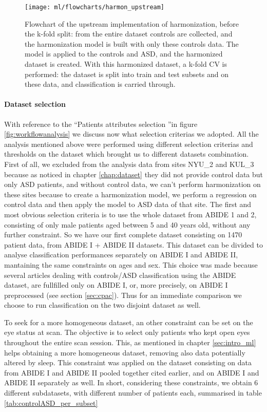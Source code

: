 \documentclass[11pt]{report}
\begin{document}
\begin{figure}[h!]
\centering
\texttt{[image: ml/flowcharts/harmon\_upstream]}
\caption{Flowchart of the upstream implementation of harmonization, before the k-fold split: from the entire dataset controls are collected, and the harmonization model is built with only these controls data. The model is applied to the controls and ASD, and the harmonized dataset is created. With this harmonized dataset, a k-fold CV is performed: the dataset is split into train and test subsets and on these data, and classification is carried through.}
\label{fig:harmon_upstream_flowchart}
\end{figure}


\paragraph{Dataset selection} \hfill

With reference to the \textquotedblleft Patients attributes selection \textquotedblright in figure \ref{fig:workflowanalysis} we discuss now what selection criterias we adopted.
All the analysis mentioned above were performed using different selection criterias and thresholds on the dataset which brought us to different datasets combination.
First of all, we excluded from the analysis data from sites NYU\_2 and KUL\_3 because as noticed in chapter \ref{chap:dataset} they did not provide control data but only ASD patients, and without control data, we can't perform harmonization on these sites because to create a harmonization model, we perform a regression on control data and then apply the model to ASD data of that site.
The first and most obvious selection criteria is to use the whole dataset from ABIDE 1 and 2, consisting of only male patients aged between 5 and 40 years old, without any further constraint. So we have our first complete dataset consisting on 1470 patient data, from ABIDE I + ABIDE II datasets.
This dataset can be divided to analyse classification performances separately on ABIDE I and ABIDE II, mantaining the same constraints on ages and sex.
This choice was made because several articles dealing with controls/ASD classification using the ABIDE dataset, are fullfilled only on ABIDE I, or, more precisely, on ABIDE I preprocessed (see section \ref{sec:cpac}). Thus for an immediate comparison we choose to run classification on the two disjoint dataset as well.

To seek for a more homogeneous dataset, an other constraint can be set on the eye status at scan. The objective is to select only patients who kept open eyes throughout the entire scan session. This, as mentioned in chapter \ref{sec:intro_ml} helps obtaining a more homogeneous dataset, removing also data potentially altered by sleep.
This constraint was applied on the dataset consisting on data from ABIDE I and ABIDE II pooled together  cited earlier, and on ABIDE I and ABIDE II separately as well.
In short, considering these constraints, we obtain 6 different subdatasets, with different number of patients each, summarised in table \ref{tab:controlASD_per_subset}
\end{document}
